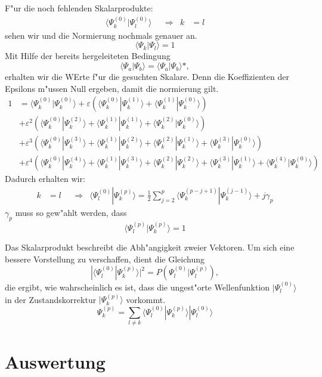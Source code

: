 \begin{refsection}
F"ur die noch fehlenden Skalarprodukte:
\begin{align*}
\langle\Psi_k^{(0)}|\Psi_l^{(0)}\rangle
&&\Rightarrow&
k&=l
\end{align*}
sehen wir und die Normierung nochmals genauer an.
\[
\langle\Psi_k|\Psi_l\rangle=1
\]
Mit Hilfe der bereits hergeleiteten Bedingung
\[
\langle\Psi_a|\Psi_b\rangle
=
\langle\Psi_a|\Psi_b\rangle\ast,
\]
erhalten wir die WErte f"ur die gesuchten Skalare. Denn die Koeffizienten der Epsilons m"ussen Null ergeben, damit die normierung gilt.
\begin{align*}
1
&=
\langle\Psi_k^{(0)}|\Psi_k^{(0)}\rangle
+\varepsilon(\langle\Psi_k^{(0)}|\Psi_k^{(1)}\rangle
+\langle\Psi_k^{(1)}|\Psi_k^{(0)}\rangle)
\\
&+\varepsilon^2(\langle\Psi_k^{(0)}|\Psi_k^{(2)}\rangle
+\langle\Psi_k^{(1)}|\Psi_k^{(1)}\rangle
+\langle\Psi_k^{(2)}|\Psi_k^{(0)}\rangle)
\\
&+\varepsilon^3(\langle\Psi_k^{(0)}|\Psi_k^{(3)}\rangle
+\langle\Psi_k^{(1)}|\Psi_k^{(2)}\rangle
+\langle\Psi_k^{(2)}|\Psi_k^{(1)}\rangle
+\langle\Psi_k^{(3)}|\Psi_k^{(0)}\rangle)
\\
&+\varepsilon^4(\langle\Psi_k^{(0)}|\Psi_k^{(4)}\rangle
+\langle\Psi_k^{(1)}|\Psi_k^{(3)}\rangle
+\langle\Psi_k^{(2)}|\Psi_k^{(2)}\rangle
+\langle\Psi_k^{(3)}|\Psi_k^{(1)}\rangle
+\langle\Psi_k^{(4)}|\Psi_k^{(0)}\rangle)
\end{align*}
Dadurch erhalten wir:
\begin{equation}
\begin{aligned}
k&=l
&&\Rightarrow&
\langle\Psi_l^{(0)}|\Psi_k^{(p)}\rangle
=
\frac12 \displaystyle\sum_{j=2}^{p} \langle\Psi_k^{(p-j+1)}|\Psi_k^{(j-1)}\rangle
+j\gamma_p
\end{aligned}
\end{equation}
$\gamma_p$ muss so gew"ahlt werden, dass
\[
\langle\Psi_l^{(p)}|\Psi_k^{(p)}\rangle=1
\]

Das Skalarprodukt beschreibt die Abh"angigkeit zweier Vektoren. Um sich eine bessere Vorstellung zu verschaffen, dient die Gleichung
\[
|\langle\Psi_l^{(0)}|\Psi_k^{(p)}\rangle|^2
=
P(\Psi_l^{(0)}|\Psi_l^{(p)}),
\]
die ergibt, wie wahrscheinlich es ist, dass die ungest"orte Wellenfunktion $|\Psi_l^{(0)}\rangle$ in der Zustandskorrektur $|\Psi_k^{(p)}\rangle$ vorkommt.
\begin{equation}
\Psi_k^{(p)}
=
\displaystyle\sum_{l\neq k} \langle\Psi_l^{(0)}|\Psi_k^{(p)}\rangle
|\Psi_l^{(0)}\rangle
\end{equation}
\section{Auswertung}


\end{refsection}
